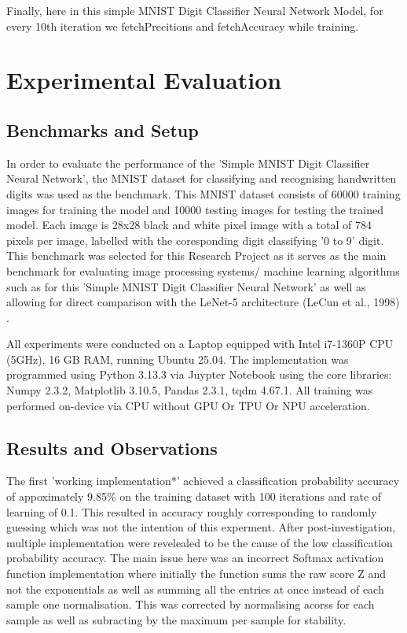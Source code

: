 \documentclass[11pt]{article}
\begin{document}
\vspace{1em}
Finally, here in this simple MNIST Digit Classifier Neural Network Model, for every 10th iteration we fetchPrecitions and fetchAccuracy while training.



\section{Experimental Evaluation}

\subsection{Benchmarks and Setup}
In order to evaluate the performance of the 'Simple MNIST Digit Classifier Neural Network', the MNIST dataset for classifying and recognising handwritten digits was used as the benchmark. This MNIST dataset consists of 60000 training images for training the model and 10000 testing images for testing the trained model. Each image is 28x28 black and white pixel image with a total of 784 pixels per image, labelled with the coresponding digit classifying '0 to 9' digit. This benchmark was selected for this Research Project as it serves as the main benchmark for evaluating image processing systems/ machine learning algorithms such as for this 'Simple MNIST Digit Classifier Neural Network' as well as allowing for direct comparison with the LeNet-5 architecture (LeCun et al., 1998) \cite{lenet}.

\vspace{1em}
All experiments were conducted on a Laptop equipped with Intel i7-1360P CPU (5GHz), 16 GB RAM, running Ubuntu 25.04. The implementation was programmed using Python 3.13.3 via Juypter Notebook using the core libraries: Numpy 2.3.2, Matplotlib 3.10.5, Pandas 2.3.1, tqdm 4.67.1. All training was performed on-device via CPU without GPU Or TPU Or NPU acceleration.

\subsection{Results and Observations}
The first 'working implementation*' achieved a classification probability accuracy of appoximately 9.85\% on the training dataset with 100 iterations and rate of learning of 0.1. This resulted in accuracy roughly corresponding to randomly guessing which was not the intention of this experment. After post-investigation, multiple implementation were revelealed to be the cause of the low classification probability accuracy. The main issue here was an incorrect Softmax activation function implementation where initially the function sums the raw score Z and not the exponentials as well as summing all the entries at once instead of each sample one normalisation. This was corrected by normalising acorss for each sample as well as subracting by the maximum per sample for stability.
\end{document}
